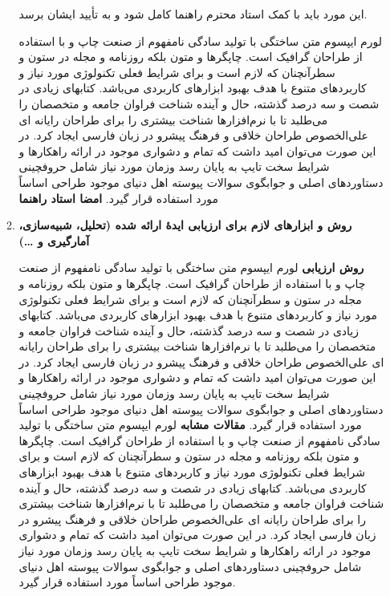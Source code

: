 \documentclass[letterpaper,11pt]{article}
\begin{document}
\begin{enumerate}
\begin{enumerate}
این مورد باید با کمک استاد محترم راهنما کامل شود و به تأیید ایشان برسد.
\begin{mdframed}[leftmargin=10pt,rightmargin=10pt]
لورم ایپسوم متن ساختگی با تولید سادگی نامفهوم از صنعت چاپ و با استفاده از طراحان گرافیک است. چاپگرها و متون بلکه روزنامه و مجله در ستون و سطرآنچنان که لازم است و برای شرایط فعلی تکنولوژی مورد نیاز و کاربردهای متنوع با هدف بهبود ابزارهای کاربردی می‌باشد. کتابهای زیادی در شصت و سه درصد گذشته، حال و آینده شناخت فراوان جامعه و متخصصان را می‌طلبد تا با نرم‌افزارها شناخت بیشتری را برای طراحان رایانه ای علی‌الخصوص طراحان خلاقی و فرهنگ پیشرو در زبان فارسی ایجاد کرد. در این صورت می‌توان امید داشت که تمام و دشواری موجود در ارائه راهکارها و شرایط سخت تایپ به پایان رسد وزمان مورد نیاز شامل حروفچینی دستاوردهای اصلی و جوابگوی سوالات پیوسته اهل دنیای موجود طراحی اساساً مورد استفاده قرار گیرد. \newline\newline
\textbf{امضا استاد راهنما}
\end{mdframed}
  \item \textbf{روش و ابزارهای لازم برای ارزیابی ایدهٔ ارائه شده (تحلیل، شبیه‌سازی، آمارگیری و …)}
\begin{mdframed}[leftmargin=10pt,rightmargin=10pt]
\textbf{روش ارزیابی} \newline
لورم ایپسوم متن ساختگی با تولید سادگی نامفهوم از صنعت چاپ و با استفاده از طراحان گرافیک است. چاپگرها و متون بلکه روزنامه و مجله در ستون و سطرآنچنان که لازم است و برای شرایط فعلی تکنولوژی مورد نیاز و کاربردهای متنوع با هدف بهبود ابزارهای کاربردی می‌باشد. کتابهای زیادی در شصت و سه درصد گذشته، حال و آینده شناخت فراوان جامعه و متخصصان را می‌طلبد تا با نرم‌افزارها شناخت بیشتری را برای طراحان رایانه ای علی‌الخصوص طراحان خلاقی و فرهنگ پیشرو در زبان فارسی ایجاد کرد. در این صورت می‌توان امید داشت که تمام و دشواری موجود در ارائه راهکارها و شرایط سخت تایپ به پایان رسد وزمان مورد نیاز شامل حروفچینی دستاوردهای اصلی و جوابگوی سوالات پیوسته اهل دنیای موجود طراحی اساساً مورد استفاده قرار گیرد. \newline
\textbf{مقالات مشابه} \newline
لورم ایپسوم متن ساختگی با تولید سادگی نامفهوم از صنعت چاپ و با استفاده از طراحان گرافیک است. چاپگرها و متون بلکه روزنامه و مجله در ستون و سطرآنچنان که لازم است و برای شرایط فعلی تکنولوژی مورد نیاز و کاربردهای متنوع با هدف بهبود ابزارهای کاربردی می‌باشد. کتابهای زیادی در شصت و سه درصد گذشته، حال و آینده شناخت فراوان جامعه و متخصصان را می‌طلبد تا با نرم‌افزارها شناخت بیشتری را برای طراحان رایانه ای علی‌الخصوص طراحان خلاقی و فرهنگ پیشرو در زبان فارسی ایجاد کرد. در این صورت می‌توان امید داشت که تمام و دشواری موجود در ارائه راهکارها و شرایط سخت تایپ به پایان رسد وزمان مورد نیاز شامل حروفچینی دستاوردهای اصلی و جوابگوی سوالات پیوسته اهل دنیای موجود طراحی اساساً مورد استفاده قرار گیرد. \newline

\end{mdframed}
\end{enumerate}
\end{enumerate}
\end{document}
